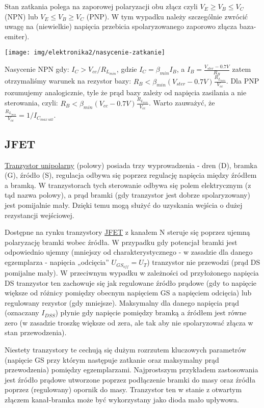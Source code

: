\documentclass{pdfBooklets}
\begin{document}
Stan zatkania polega na zaporowej polaryzacji obu złącz czyli $V_E \geq V_B \leq V_C$ (NPN) lub $V_E \leq V_B \geq V_C$ (PNP).
W tym wypadku należy szczególnie zwrócić uwagę na (niewielkie) napięcia przebicia spolaryzowanego zaporowo złącza baza-emiter).

\begin{center}\texttt{[image: img/elektronika2/nasycenie-zatkanie]}\end{center}

Nasycenie NPN gdy: $I_C > V_{cc} / R_{L_{min}}$, gdzie $I_C = \beta_{min} I_B$, a $I_B = \frac{V_{ster} - 0.7V}{R_B}$ zatem otrzymaliśmy warunek na rezystor bazy: $R_B < \beta_{min} (V_{ster} - 0.7V) \frac{R_{L_{min}}}{V_{cc}}$. Dla PNP rozumujemy analogicznie, tyle że prąd bazy zależy od napięcia zasilania a nie sterowania, czyli: $R_B < \beta_{min} (V_{cc} - 0.7V) \frac{R_{L_{min}}}{V_{cc}}$. Warto zauważyć, że $\frac{R_{L_{min}}}{V_{cc}} = 1/I_{C_{max\ ukl}}$.

\subsection{JFET}
\href{https://pl.wikipedia.org/wiki/Tranzystor polowy}{Tranzystor unipolarny} (polowy) posiada trzy wyprowadzenia - dren (D), bramka (G), źródło (S), regulacja odbywa się poprzez regulację napięcia między źródłem a bramką. W tranzystorach tych sterowanie odbywa się polem elektrycznym (z tąd nazwa polowy), a prąd bramki (gdy tranzystor jest dobrze spolaryzowany) jest pomijalnie mały. Dzięki temu mogą służyć do uzyskania wejścia o dużej rezystancji wejściowej.

Dostępne na rynku tranzystory \href{https://pl.wikipedia.org/wiki/Tranzystor polowy złączowy}{JFET} z kanałem N steruje się poprzez ujemną polaryzację bramki wobec źródła. W przypadku gdy potencjał bramki jest odpowiednio ujemny (mniejszy od charakterystycznego - w zasadzie dla danego egzemplarza - napięcia „odcięcia” $U_{GS_{off}} = U_T$) tranzystor nie przewodzi (prąd DS pomijalne mały). W przeciwnym wypadku w zależności od przyłożonego napięcia DS tranzystor ten zachowuje się jak regulowane źródło prądowe (gdy to napięcie większe od różnicy pomiędzy obecnym napięciem GS a napięciem odcięcia) lub regulowany rezystor (gdy mniejsze). Maksymalny dla danego napięcia prąd (oznaczany $I_{DSS}$) płynie gdy napięcie pomiędzy bramką a źródłem jest równe zero (w zasadzie troszkę większe od zera, ale tak aby nie spolaryzować złącza w stan przewodzenia).

Niestety tranzystory te cechują się dużym rozrzutem kluczowych parametrów (napięcie GS przy którym następuje zatkanie oraz maksymalny prąd przewodzenia) pomiędzy egzemplarzami. Najprostszym przykładem zastosowania jest źródło prądowe utworzone poprzez podłączenie bramki do masy oraz źródła poprzez (regulowany) opornik do masy. Tranzystor ten w stanie z otwartym złączem kanał-bramka może być wykorzystany jako dioda mało upływowa.
\end{document}
